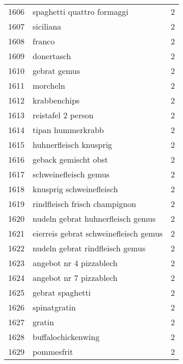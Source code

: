 \begin{tabular}{llr}
1606 &                         spaghetti quattro formaggi &      2 \\
1607 &                                          siciliana &      2 \\
1608 &                                             franco &      2 \\
1609 &                                         donertasch &      2 \\
1610 &                                       gebrat gemus &      2 \\
1611 &                                           morcheln &      2 \\
1612 &                                       krabbenchips &      2 \\
1613 &                                 reistafel 2 person &      2 \\
1614 &                                  tipan hummerkrabb &      2 \\
1615 &                             huhnerfleisch knusprig &      2 \\
1616 &                               geback gemischt obst &      2 \\
1617 &                              schweinefleisch gemus &      2 \\
1618 &                           knusprig schweinefleisch &      2 \\
1619 &                      rindfleisch frisch champignon &      2 \\
1620 &                  nudeln gebrat huhnerfleisch gemus &      2 \\
1621 &              eierreis gebrat schweinefleisch gemus &      2 \\
1622 &                    nudeln gebrat rindfleisch gemus &      2 \\
1623 &                            angebot nr 4 pizzablech &      2 \\
1624 &                            angebot nr 7 pizzablech &      2 \\
1625 &                                   gebrat spaghetti &      2 \\
1626 &                                       spinatgratin &      2 \\
1627 &                                             gratin &      2 \\
1628 &                                 buffalochickenwing &      2 \\
1629 &                                         pommesfrit &      2 \\

\end{tabular}
